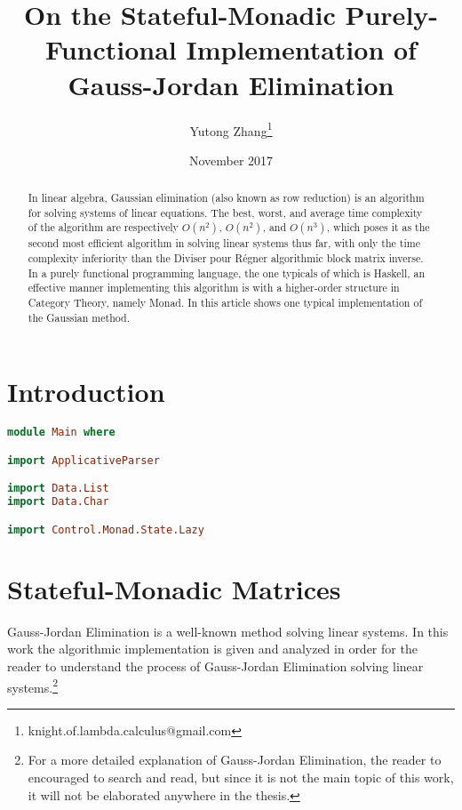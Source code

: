 \documentclass[12pt,a4paper]{article}
\title{On the Stateful-Monadic Purely-Functional Implementation of Gauss-Jordan Elimination}
\date{November 2017}
\author{Yutong Zhang\thanks{knight.of.lambda.calculus@gmail.com}}
\begin{document}
\maketitle
\begin{abstract}
In linear algebra, Gaussian elimination (also known as row reduction) is an algorithm for solving systems of linear equations. The best, worst, and average time complexity of the algorithm are respectively $O(n^2)$, $O(n^2)$, and $O(n^3)$, which poses it as the second most efficient algorithm in solving linear systems thus far, with only the time complexity inferiority than the Diviser pour Régner algorithmic block matrix inverse. In a purely functional programming language, the one typicals of which is Haskell, an effective manner implementing this algorithm is with a higher-order structure in Category Theory, namely Monad. In this article shows one typical implementation of the Gaussian method.
\end{abstract}

\section{Introduction}
\begin{lstlisting}[language=Haskell]
module Main where

import ApplicativeParser

import Data.List
import Data.Char

import Control.Monad.State.Lazy
\end{lstlisting}

\section{Stateful-Monadic Matrices}
Gauss-Jordan Elimination is a well-known method solving linear systems. In this work the algorithmic implementation is given and analyzed in order for the reader to understand the process of Gauss-Jordan Elimination solving linear systems.\footnote{For a more detailed explanation of Gauss-Jordan Elimination, the reader to encouraged to search and read, but since it is not the main topic of this work, it will not be elaborated anywhere in the thesis.}
\end{document}
